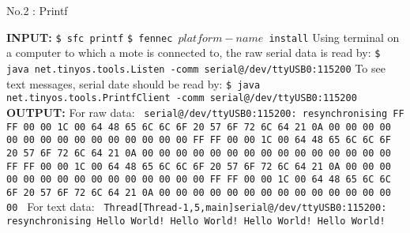\documentclass[11pt]{article}
\begin{document}
\begin{center}
{\large No.2 : Printf}	
\end{center}
\vspace{1cm}
	\textbf{INPUT:}\newline
	\texttt{\$ sfc printf} \newline
	\texttt{\$ fennec $platform-name$ install}\newline
	Using terminal on a computer to which a mote is 
	connected to, the raw serial data is read by: \newline
	\texttt{\$ java net.tinyos.tools.Listen -comm serial@/dev/ttyUSB0:115200} \newline
	To see text messages, serial date should be read by: \newline
	\texttt{\$ java net.tinyos.tools.PrintfClient -comm serial@/dev/ttyUSB0:115200} \newline
	\textbf{OUTPUT:}\newline
	For raw data: \newline
	\texttt{\scriptsize 
		serial@/dev/ttyUSB0:115200: resynchronising FF FF 00 00 1C 00 64 48 65 6C 6C 6F 20 57 6F 72 6C 64 21 0A 00 00 00 00 00 00 00 00 00 00 00 00 00 00 00 FF FF 00 00 1C 00 64 48 65 6C 6C 6F 20 57 6F 72 6C 64 21 0A 00 00 00 00 00 00 00 00 00 00 00 00 00 00 00 FF FF 00 00 1C 00 64 48 65 6C 6C 6F 20 57 6F 72 6C 64 21 0A 00 00 00 00 00 00 00 00 00 00 00 00 00 00 00 FF FF 00 00 1C 00 64 48 65 6C 6C 6F 20 57 6F 72 6C 64 21 0A 00 00 00 00 00 00 00 00 00 00 00 00 00 00 00\newline
	}
	For text data: \newline
	\texttt{\scriptsize 
		Thread[Thread-1,5,main]serial@/dev/ttyUSB0:115200: resynchronising\newline
		Hello World!\newline
		Hello World!\newline
		Hello World!\newline
		Hello World!\newline
	}

\newpage
\end{document}
